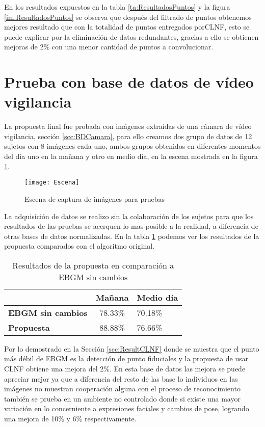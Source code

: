 En los resultados expuestos en la tabla \ref{ta:ResultadosPuntos} y la figura \ref{im:ResultadosPuntos} se observa que después del filtrado de puntos obtenemos mejores resultado que con la totalidad de puntos entregados por\ac{CLNF}, esto se puede explicar por la eliminación de datos redundantes, gracias a ello se obtienen mejoras de 2\% con una menor cantidad de puntos a convolucionar.


\section{Prueba con base de datos de vídeo vigilancia}

La propuesta final fue probada con imágenes extraídas de una cámara de vídeo vigilancia, sección \ref{scc:BDCamara}, para ello creamos dos grupo de datos de 12 sujetos con 8 imágenes cada uno, ambos grupos obtenidos en diferentes momentos del día uno en la mañana y otro en medio día, en la escena mostrada en la figura \ref{im:Escena}.

\begin{figure}[h]
	\centering
	\texttt{[image: Escena]}
    \caption{Escena de captura de imágenes para pruebas}
    \label{im:Escena}
\end{figure}

La adquisición de datos se realizo sin la colaboración de los sujetos para que los resultados de las pruebas se acerquen lo mas posible a la realidad, a diferencia de otras bases de datos normalizadas. En la tabla \ref{ta:resultadosCLNF} podemos ver los resultados de la propuesta comparados con el algoritmo original.

\begin{table}[h]
\centering
\caption{Resultados de la propuesta en comparación a \ac{EBGM} sin cambios}
\label{ta:resultadosCLNF}
\begin{tabular}{|l|c|l|}
\hline
\textbf{}                   & \textbf{Mañana} & \textbf{Medio día} \\ \hline
\textbf{EBGM sin cambios}   & 78.33\%         & 70.18\%            \\ \hline
\textbf{Propuesta} & 88.88\%         & 76.66\%            \\ \hline
\end{tabular}
\end{table}

Por lo demostrado en la Sección \ref{scc:ResultCLNF} donde se muestra que el punto más débil de \ac{EBGM} es la detección de punto fiduciales y la propuesta de usar \ac{CLNF} obtiene una mejora del 2\%. En esta base de datos las mejora se puede apreciar mejor ya que a diferencia del resto de las base lo individuos en las imágenes no muestran cooperación alguna con el proceso de reconocimiento también se prueba en un ambiente no controlado donde si existe una mayor variación en lo concerniente a expresiones faciales y cambios de pose, logrando una mejora de 10\% y 6\% respectivamente.

